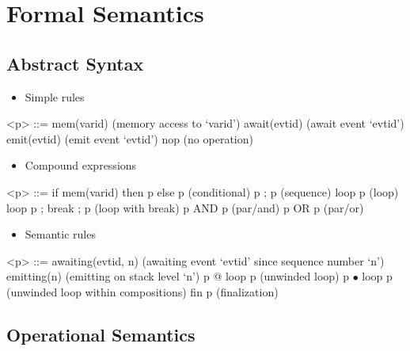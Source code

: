 \documentclass[9pt]{article}
\begin{document}
\section{Formal Semantics}

\subsection{Abstract Syntax}
\label{sub:syntax}

\begin{itemize}
  \item Simple rules
\end{itemize}

\begin{grammar}
<p> ::= mem(varid)                   \hfill (memory access to `varid')
\alt await(evtid)                    \hfill (await event `evtid')
\alt emit(evtid)                     \hfill (emit event `evtid')
\alt nop                             \hfill (no operation)
\end{grammar}

\begin{itemize}
  \item Compound expressions 
\end{itemize}

\begin{grammar}
<p> ::= if mem(varid) then p else p  \hfill (conditional) 
\alt p ; p                           \hfill (sequence)
\alt loop p                          \hfill (loop)
\alt loop p ; break ; p              \hfill (loop with break)
\alt p AND p                         \hfill (par/and)
\alt p OR p                          \hfill (par/or)
\end{grammar}

\begin{itemize}
  \item Semantic rules 
\end{itemize}

\begin{grammar}
<p> ::= awaiting(evtid, n)           \hfill (awaiting event `evtid' since sequence number `n')
\alt emitting(n)                     \hfill (emitting on stack level `n')
\alt p @ loop p                      \hfill (unwinded loop)
\alt p $\bullet$ loop p              \hfill (unwinded loop within compositions)
\alt fin p                           \hfill (finalization)

\end{grammar}

\subsection{Operational Semantics}
\label{sec:operational}
\end{document}
